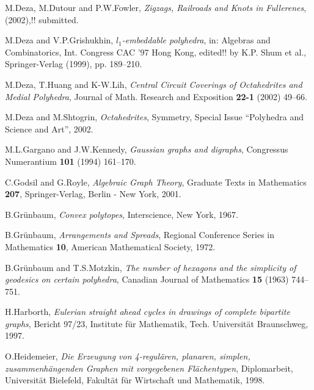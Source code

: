 \documentclass[12pt]{article}
\begin{document}
\begin{thebibliography}{99}



M.Deza, M.Dutour and P.W.Fowler,
{\em Zigzags, Railroads and Knots in Fullerenes}, (2002),!!
submitted.


M.Deza and V.P.Grishukhin,
{\em $l_1$-embeddable polyhedra},
in: Algebras and Combinatorics, Int. Congress CAC '97 Hong Kong,
edited!! by K.P. Shum et al., Springer-Verlag (1999), pp. 189--210.


M.Deza, T.Huang and K-W.Lih,
{\em Central Circuit Coverings of Octahedrites and Medial Polyhedra},
Journal of Math. Research and Exposition {\bf 22-1} (2002) 49--66.


M.Deza and M.Shtogrin,
{\em Octahedrites}, 
Symmetry, Special Issue ``Polyhedra and Science and Art'', 2002.


M.L.Gargano and J.W.Kennedy,
{\em Gaussian graphs and digraphs}, Congressus Numerantium {\bf 101}
(1994) 161--170.


C.Godsil and G.Royle, {\em Algebraic Graph Theory}, Graduate Texts in 
Mathematics {\bf 207}, Springer-Verlag, Berlin - New York, 2001.


B.Gr\"{u}nbaum, {\em Convex polytopes}, Interscience, New York, 1967.


B.Gr\"{u}nbaum, {\em Arrangements and Spreads}, Regional Conference Series in
Mathematics {\bf 10}, American Mathematical Society, 1972.


B.Gr\"{u}nbaum and T.S.Motzkin, {\em The number of hexagons and the simplicity
of geodesics on certain polyhedra}, Canadian Journal of Mathematics {\bf 15} (1963) 744--751.


H.Harborth, {\em Eulerian straight ahead cycles in drawings of complete
bipartite graphs}, Bericht 97/23, Institute f\"{u}r Mathematik, Tech. 
Universit\"{a}t
Braunschweg, 1997.


O.Heidemeier, {\em Die Erzeugung von 4-regul\"{a}ren, planaren,
simplen, zusammenh\"{a}ngenden Graphen mit vorgegebenen Fl\"{a}chentypen},
Diplomarbeit, Universit\"{a}t Bielefeld, Fakult\"{a}t f\"{u}r Wirtschaft und
Mathematik, 1998. 


\end{thebibliography}
\end{document}
